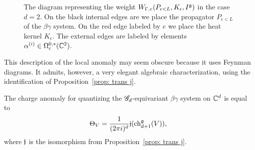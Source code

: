 \begin{figure}
\begin{center}
\caption{The diagram representing the weight $W_{\Gamma, e}(P_{\epsilon<L}, K_\epsilon, I^\mathfrak g)$ in the case $d=2$. 
On the black internal edges are we place the propagator $P_{\epsilon < L}$ of the $\beta\gamma$ system. 
On the red edge labeled by $e$ we place the heat kernel $K_\epsilon$.
The external edges are labeled by elements $\alpha^{(i)} \in \Omega^{0,*}_c(\mathbb C^2)$.}
\label{fig:liewheel}
\end{center}
\end{figure}


This description of the local anomaly may seem obscure because it uses Feynman diagrams.
It admits, however, a very elegant algebraic characterization, using the identification of Proposition~\ref{prop: trans j}. 

\begin{prop}\label{prop: bg anomaly}
The charge anomaly for quantizing the $\mathscr G_d$-equivariant $\beta\gamma$ system on $\mathbb C^d$ is equal to
\[
\Theta_V = \frac{1}{(2\pi i)^d} \mathfrak j ({\rm ch}_{d+1}^{\mathfrak g}(V)),
\]
where $\mathfrak j$ is the isomorphism from Proposition~\ref{prop: trans j}.
\end{prop}

